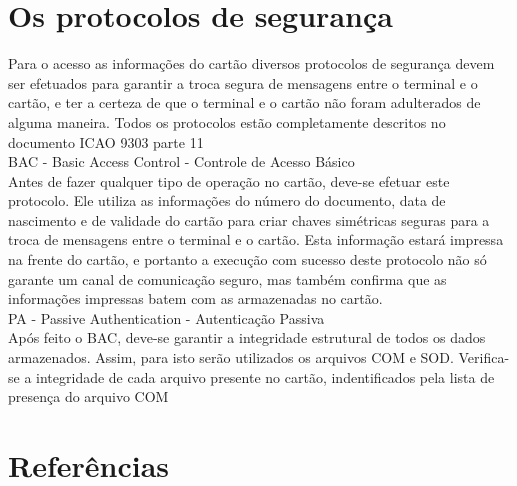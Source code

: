\documentclass{article}
\begin{document}
	\section{Os protocolos de segurança}
		\begin{flushleft}
			\hspace{2cm}Para o acesso as informações do cartão diversos protocolos de segurança devem ser efetuados para garantir a troca segura de mensagens entre o terminal e o cartão, e ter a certeza de que o terminal e o cartão não foram adulterados de alguma maneira. Todos os protocolos estão completamente descritos no documento ICAO 9303 parte 11\\
			\vspace{10px}
			\hspace{2cm} BAC - Basic Access Control - Controle de Acesso Básico\\
			\hspace{2cm} Antes de fazer qualquer tipo de operação no cartão, deve-se efetuar este protocolo. Ele utiliza as informações do número do documento, data de nascimento e de validade do cartão para criar chaves simétricas seguras para a troca de mensagens entre o terminal e o cartão. Esta informação estará impressa na frente do cartão, e portanto a execução com sucesso deste protocolo não só garante um canal de comunicação seguro, mas também confirma que as informações impressas batem com as armazenadas no cartão.\\
			\vspace{10px}
			\hspace{2cm} PA - Passive Authentication - Autenticação Passiva\\
			\hspace{2cm} Após feito o BAC, deve-se garantir a integridade estrutural de todos os dados armazenados. Assim, para isto serão utilizados os arquivos COM e SOD. Verifica-se a integridade de cada arquivo presente no cartão, indentificados pela lista de presença do arquivo COM
			
		\end{flushleft}

	\section{}
		\begin{flushleft}
			
			
		\end{flushleft}

\begingroup
	\section{Referências}
		\renewcommand{\section}[2]{}
		
		
		
		
\endgroup
\end{document}
